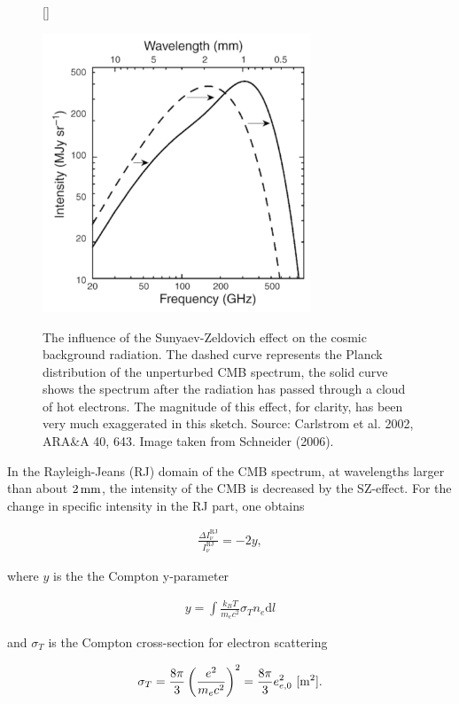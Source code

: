 \documentclass[a4paper,11pt]{article}
\begin{document}
\begin{figure}[h]
    [\FBwidth]
    {\caption{\footnotesize{The influence of the Sunyaev-Zeldovich effect on the cosmic background radiation. The dashed curve represents the Planck distribution of the unperturbed CMB spectrum, the solid curve shows the spectrum after the radiation has passed through a cloud of hot electrons. The magnitude of this effect, for clarity, has been very much exaggerated in this sketch. Source: Carlstrom et al. 2002, ARA\&A 40, 643. Image taken from Schneider (2006).}}
    \label{fig:szeffect}}
    {\includegraphics[width=8cm]{figures/SZeffect.png}}
\end{figure}

{\noindent}In the Rayleigh-Jeans (RJ) domain of the CMB spectrum, at wavelengths larger than about $2\,{\rm mm}$, the intensity of the CMB is decreased by the SZ-effect. For the change in specific intensity in the RJ part, one obtains

\begin{align*}
    \frac{\Delta I_\nu^\mathrm{RJ}}{I_\nu^\mathrm{RJ}} = -2y,
\end{align*}

{\noindent}where $y$ is the the Compton y-parameter

\begin{align*}
    y = \int\frac{k_BT}{m_ec^2}\sigma_Tn_e\mathrm{d}l
\end{align*}

{\noindent}and $\sigma_T$ is the Compton cross-section for electron scattering

\begin{align*}
    \sigma_T = \frac{8\pi}{3}\left(\frac{e^2}{m_ec^2}\right)^2 = \frac{8\pi}{3}e_{e,0}^2 ~ [{\rm m^2}].
\end{align*}
\end{document}
